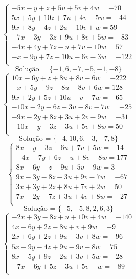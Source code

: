 \documentclass[12pt,oneside,a4paper]{article}
\begin{document}
\vspace{\baselineskip}
\begin{equation*}
\begin{cases}
-5x-y+z+5u+5v+4w=-70 \\
5x+5y+10z+7u+4v-5w=-44 \\
9x+8y-4z+2u-10v+w=59 \\
-7x-3y-3z+9u+8v+5w=-83 \\
-4x+4y+7z-u+7v-10w=57 \\
-x-9y+7z+10u-6v-3w=-122 \\
\end{cases}
\end{equation*}
\begin{equation*}
\text{Solução = }\{-1,6,-7,-5,-1,-8\}
\end{equation*}
\vspace{\baselineskip}
\begin{equation*}
\begin{cases}
10x-6y+z+8u+8v-6w=-222 \\
-x+5y-9z-8u-8v+6w=128 \\
9x+2y+5z+10u-v-7w=-65 \\
-10x-2y-6z+3u-8v-7w=-25 \\
-9x-2y+8z+3u+2v-9w=-31 \\
-10x-y-3z-3u+5v+8w=50 \\
\end{cases}
\end{equation*}
\begin{equation*}
\text{Solução = }\{-4,10,6,-3,-7,8\}
\end{equation*}
\vspace{\baselineskip}
\begin{equation*}
\begin{cases}
8x-y-3z-6u+7v+5w=-14 \\
-4x-7y+6z+u+8v+8w=177 \\
8x-6y-z+9u+5v-9w=3 \\
9x-3y-8z-3u+9v-7w=-67 \\
3x+3y+2z+8u+7v+2w=50 \\
7x-2y-7z+3u+4v+8w=-27 \\
\end{cases}
\end{equation*}
\begin{equation*}
\text{Solução = }\{-5,-5,8,2,6,3\}
\end{equation*}
\vspace{\baselineskip}
\begin{equation*}
\begin{cases}
-2x+3y-8z+u+10v+4w=-140 \\
4x-6y+2z-8u+v+9w=-9 \\
2x+6y+2z+9u-3v+8w=-96 \\
5x-9y-4z+9u-9v-8w=75 \\
8x-5y+9z-2u+3v+5w=-28 \\
-7x-6y+5z-3u+5v-w=-89 \\
\end{cases}
\end{equation*}
\end{document}
